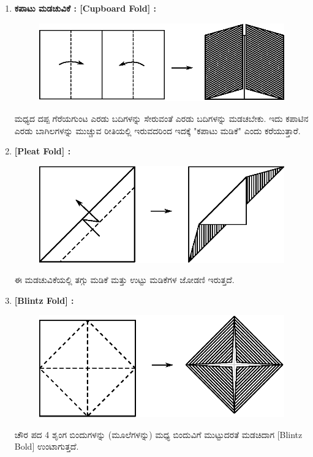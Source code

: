 \begin{enumerate}
\item  \textbf{ಕಪಾಟು ಮಡಚುವಿಕೆ : [Cupboard Fold] :} 
\begin{figure}[H]
\centering
\includegraphics[scale=.98]{src/figure/chap1/fig1-4.eps}
\end{figure}


ಮಧ್ಯದ ದಪ್ಪ ಗೆರೆಯಗುಂಟ ಎರಡು ಬದಿಗಳನ್ನು ಸೇರುವಂತೆ ಎರಡು ಬದಿಗಳನ್ನು ಮಡಚಬೇಕು. ಇದು ಕಪಾಟಿನ ಎರಡು ಬಾಗಿಲಗಳನ್ನು ಮುಚ್ಚುವ ರೀತಿಯಲ್ಲಿ ಇರುವದರಿಂದ ಇದಕ್ಕೆ "ಕಪಾಟು ಮಡಿಕೆ" ಎಂದು ಕರೆಯುತ್ತಾರೆ. 

\item  \textbf{[Pleat Fold] :}
\begin{figure}[H]
\centering
\includegraphics[scale=.98]{src/figure/chap1/fig1-5.eps}
\end{figure}


ಈ ಮಡಚುವಿಕೆಯಲ್ಲಿ ತಗ್ಗು ಮಡಿಕೆ ಮತ್ತು ಉಟ್ಟು ಮಡಿಕೆಗಳ ಜೋಡಣಿ ಇರುತ್ತದೆ. 

\item  \textbf{[Blintz Fold] :}
\begin{figure}[H]
\centering
\includegraphics[scale=.98]{src/figure/chap1/fig1-6.eps}
\end{figure}


ಚೌರ ಪದ 4  ಶೃಂಗ ಬಿಂದುಗಳನ್ನು (ಮೂಲೆಗಳನ್ನು) ಮಧ್ಯ ಬಿಂದುವಿಗೆ ಮುಟ್ಟುದರತೆ ಮಡಚಿದಾಗ [Blintz Bold] ಉಂಟಾಗುತ್ತದೆ. 
 \end{enumerate}


